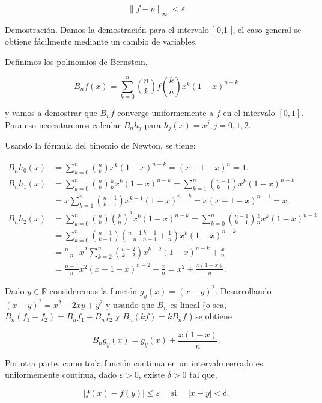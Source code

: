 \documentclass[10pt]{article}
\begin{document}
$$
\|f-p\|_{\infty}<\varepsilon
$$

Demostración. Damos la demostración para el intervalo [ 0,1 ], el caso general se obtiene fácilmente mediante un cambio de variables.

Definimos los polinomios de Bernstein,

$$
B_{n} f(x)=\sum_{k=0}^{n}\binom{n}{k} f\left(\frac{k}{n}\right) x^{k}(1-x)^{n-k}
$$

y vamos a demostrar que $B_{n} f$ converge uniformemente a $f$ en el intervalo $[0,1]$. Para eso necesitaremos calcular $B_{n} h_{j}$ para $h_{j}(x)=x^{j}, j=0,1,2$.

Usando la fórmula del binomio de Newton, se tiene:

$$
\begin{aligned}
B_{n} h_{0}(x) & =\sum_{k=0}^{n}\binom{n}{k} x^{k}(1-x)^{n-k}=(x+1-x)^{n}=1 . \\
B_{n} h_{1}(x) & =\sum_{k=0}^{n}\binom{n}{k} \frac{k}{n} x^{k}(1-x)^{n-k}=\sum_{k=1}^{n}\binom{n-1}{k-1} x^{k}(1-x)^{n-k} \\
& =x \sum_{k=1}^{n}\binom{n-1}{k-1} x^{k-1}(1-x)^{n-k}=x(x+1-x)^{n-1}=x . \\
B_{n} h_{2}(x) & =\sum_{k=0}^{n}\binom{n}{k}\left(\frac{k}{n}\right)^{2} x^{k}(1-x)^{n-k}=\sum_{k=0}^{n}\binom{n-1}{k-1} \frac{k}{n} x^{k}(1-x)^{n-k} \\
& =\sum_{k=0}^{n}\binom{n-1}{k-1}\left(\frac{n-1}{n} \frac{k-1}{n-1}+\frac{1}{n}\right) x^{k}(1-x)^{n-k} \\
& =\frac{n-1}{n} x^{2} \sum_{k=2}^{n}\binom{n-2}{k-2} x^{k-2}(1-x)^{n-k}+\frac{x}{n} \\
& =\frac{n-1}{n} x^{2}(x+1-x)^{n-2}+\frac{x}{n}=x^{2}+\frac{x(1-x)}{n} .
\end{aligned}
$$

Dado $y \in \mathbb{R}$ consideremos la función $g_{y}(x)=(x-y)^{2}$. Desarrollando $(x-y)^{2}=x^{2}-2 x y+y^{2}$ y usando que $B_{n}$ es lineal (o sea, $B_{n}\left(f_{1}+f_{2}\right)=B_{n} f_{1}+B_{n} f_{2}$ y $B_{n}(k f)=k B_{n} f$ ) se obtiene


\begin{equation*}
B_{n} g_{y}(x)=g_{y}(x)+\frac{x(1-x)}{n} . \tag{6.1}
\end{equation*}


Por otra parte, como toda función continua en un intervalo cerrado es uniformemente continua, dado $\varepsilon>0$, existe $\delta>0$ tal que,

$$
|f(x)-f(y)| \leq \varepsilon \quad \text { si } \quad|x-y|<\delta .
$$
\end{document}
